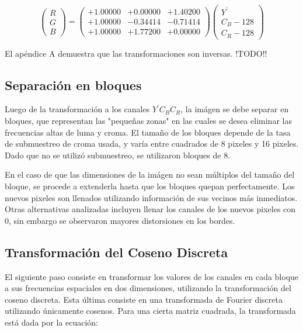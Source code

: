 \documentclass[%
	final,
	reprint,
	notitlepage,
	narroweqnarray,
	inline,
	twoside,
	invited
	]{ieee}
\begin{document}
\[
 \begin{pmatrix} R \\ G \\ B \end{pmatrix} = \begin{pmatrix} +1.00000 & +0.00000 & +1.40200 \\
+1.00000 & -0.34414 & -0.71414 \\
+1.00000& +1.77200 & +0.00000  \end{pmatrix}  \begin{pmatrix}Y^{'} \\ C_B - 128\\ C_R - 128\end{pmatrix}
\]

\par El apéndice A demuestra que las transformaciones son inversas. !TODO!!

\subsection{Separación en bloques}

\par Luego de la transformación a los canales $Y^{'}C_BC_R$, la imágen se debe separar en bloques, que representan 
las "pequeñas zonas" en las cuales se desea eliminar las frecuencias altas de luma y croma. El tamaño de los bloques 
depende de la tasa de submuestreo de croma usada, y varía entre cuadrados de 8 pixeles y 16 pixeles. Dado que 
no se utilizó submuestreo, se utilizaron bloques de 8.
\par En el caso de que las dimensiones de la imágen no sean múltiplos del tamaño del bloque, se procede a extenderla 
hasta que los bloques quepan perfectamente. Los nuevos pixeles son llenados utilizando información de sus vecinos más 
inmediatos. Otras alternativas analizadas incluyen llenar los canales de los nuevos pixeles con 0, sin embargo se observaron 
mayores distorsiones en los bordes.

\subsection{Transformación del Coseno Discreta}

El siguiente paso consiste en transformar los valores de los canales en cada bloque a sus 
frecuencias espaciales en dos dimensiones, 
utilizando la transformación del coseno discreta. Esta última consiste en una transformada 
de Fourier discreta utilizando únicamente cosenos. Para una cierta matriz cuadrada, la transformada está 
dada por la ecuación:
\end{document}
